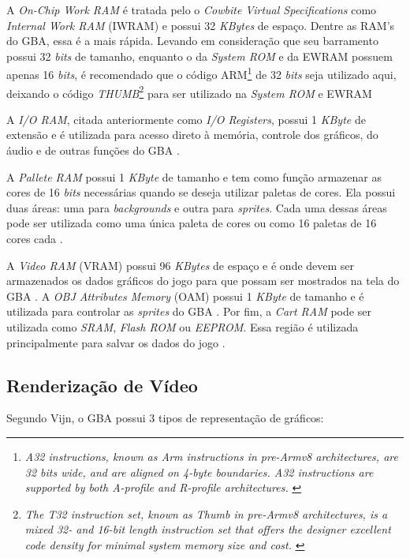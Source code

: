     A \textit{On-Chip Work RAM} é tratada pelo o \textit{Cowbite Virtual Specifications} como \textit{Internal Work RAM} (IWRAM) e possui 32 \textit{KBytes} de espaço. Dentre as RAM's do GBA, essa é a mais rápida. Levando em consideração que seu barramento possui 32 \textit{bits} de tamanho, enquanto o da \textit{System ROM} e da EWRAM possuem apenas 16 \textit{bits}, é recomendado que o código ARM\footnote{\textit{A32 instructions, known as Arm instructions in pre-Armv8 architectures, are 32 bits wide, and are aligned on 4-byte boundaries. A32 instructions are supported by both A-profile and R-profile architectures.} \cite{arm}} de 32 \textit{bits} seja utilizado aqui, deixando o código \textit{THUMB}\footnote{\textit{The T32 instruction set, known as Thumb in pre-Armv8 architectures, is a mixed 32- and 16-bit length instruction set that offers the designer excellent code density for minimal system memory size and cost.} \cite{arm}} para ser utilizado na \textit{System ROM} e EWRAM \cite{cowbite}

    A \textit{I/O RAM}, citada anteriormente como \textit{I/O Registers}, possui 1 \textit{KByte} de extensão e é utilizada para acesso direto à memória, controle dos gráficos, do áudio e de outras funções do GBA \cite{cowbite}.

    A \textit{Pallete RAM} possui 1 \textit{KByte} de tamanho e tem como função armazenar as cores de 16 \textit{bits} necessárias quando se deseja utilizar paletas de cores. Ela possui duas áreas: uma para \textit{backgrounds} e outra para \textit{sprites}. Cada uma dessas áreas pode ser utilizada como uma única paleta de cores ou como 16 paletas de 16 cores cada \cite{cowbite}.

    A \textit{Video RAM} (VRAM) possui 96 \textit{KBytes} de espaço e é onde devem ser armazenados os dados gráficos do jogo para que possam ser mostrados na tela do GBA \cite{cowbite}. A \textit{OBJ Attributes Memory} (OAM) possui 1 \textit{KByte} de tamanho e é utilizada para controlar as \textit{sprites} do GBA \cite{cowbite}. Por fim, a \textit{Cart RAM} pode ser utilizada como \textit{SRAM}, \textit{Flash ROM} ou \textit{EEPROM}. Essa região é utilizada principalmente para salvar os dados do jogo \cite{cowbite}.

  \subsection{Renderização de Vídeo}

    Segundo Vijn, o GBA possui 3 tipos de representação de gráficos:


